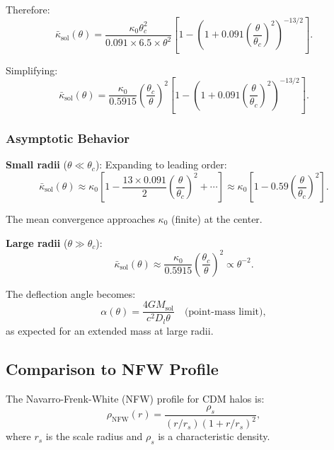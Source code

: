 \documentclass[11pt,a4paper]{article}
\theoremstyle{definition}
\theoremstyle{remark}
\begin{document}
Therefore:
\begin{equation}
\bar{\kappa}_{\mathrm{sol}}(\theta) = \frac{\kappa_0 \theta_c^2}{0.091 \times 6.5 \times \theta^2} \left[1 - \left(1 + 0.091\left(\frac{\theta}{\theta_c}\right)^2\right)^{-13/2}\right].
\end{equation}

Simplifying:
\begin{equation}
\label{eq:kappa_bar_soliton}
\boxed{\bar{\kappa}_{\mathrm{sol}}(\theta) = \frac{\kappa_0}{0.5915} \left(\frac{\theta_c}{\theta}\right)^2 \left[1 - \left(1 + 0.091\left(\frac{\theta}{\theta_c}\right)^2\right)^{-13/2}\right].}
\end{equation}

\subsubsection{Asymptotic Behavior}

\textbf{Small radii} ($\theta \ll \theta_c$): Expanding to leading order:
\begin{equation}
\bar{\kappa}_{\mathrm{sol}}(\theta) \approx \kappa_0 \left[1 - \frac{13 \times 0.091}{2}\left(\frac{\theta}{\theta_c}\right)^2 + \cdots\right] \approx \kappa_0 \left[1 - 0.59\left(\frac{\theta}{\theta_c}\right)^2\right].
\end{equation}

The mean convergence approaches $\kappa_0$ (finite) at the center.

\textbf{Large radii} ($\theta \gg \theta_c$):
\begin{equation}
\bar{\kappa}_{\mathrm{sol}}(\theta) \approx \frac{\kappa_0}{0.5915} \left(\frac{\theta_c}{\theta}\right)^2 \propto \theta^{-2}.
\end{equation}

The deflection angle becomes:
\begin{equation}
\alpha(\theta) = \frac{4GM_{\mathrm{sol}}}{c^2 D_l \theta} \quad \text{(point-mass limit)},
\end{equation}
as expected for an extended mass at large radii.

\subsection{Comparison to NFW Profile}
\label{sec:nfw_comparison}

The Navarro-Frenk-White (NFW) profile for CDM halos is:
\begin{equation}
\label{eq:nfw_profile}
\rho_{\mathrm{NFW}}(r) = \frac{\rho_s}{(r/r_s)(1 + r/r_s)^2},
\end{equation}
where $r_s$ is the scale radius and $\rho_s$ is a characteristic density.
\end{document}
